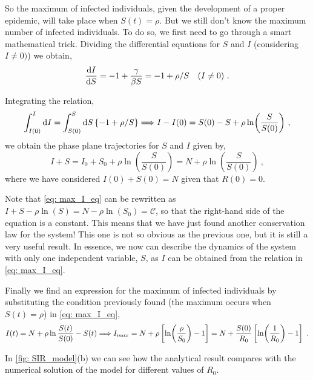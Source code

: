So the maximum of infected individuals, given the development of a proper
epidemic, will take place when $S(t)=\rho$. But we still don't know the
maximum number of infected individuals. To do so, we first need to go through
a smart mathematical trick. Dividing the differential equations for $S$ and $I$
(considering $I\neq0)$) we obtain,
\begin{equation*}
  \frac{\mathrm{d} I}{\mathrm{d} S}=-1+\frac{\gamma}{\beta S}=-1+\rho/S \quad (I\neq0) \
  .
\end{equation*}

Integrating the relation,
\begin{equation*}
  \int_{I(0)}^{I}\mathrm{d} I=\int_{S(0)}^S\mathrm{d} S \left\{-1 + \rho/S\right\} \Longrightarrow
  I-I(0)=S(0)-S+\rho\ln(\frac{S}{S(0)}) \ ,
\end{equation*}
we obtain the phase plane trajectories for $S$ and $I$ given by,
\begin{equation}\label{eq: max_I_eq}
  I+S=I_0+S_0+\rho\ln(\frac{S}{S(0)})=N+\rho\ln(\frac{S}{S(0)}) \ ,
\end{equation}
where we have considered $I(0)+S(0)=N$ given that $R(0)=0$.

Note that \cref{eq: max_I_eq} can be rewritten as
$I+S-\rho\ln(S)=N-\rho\ln(S_0)=\mathcal{C}$, so that the right-hand side of the
equation is a constant. This means that we have just found another conservation
law for the system! This one is not so obvious as the previous one, but it is
still a very useful result. In essence, we now can describe the dynamics of the
system with only one independent variable, $S$, as $I$ can be obtained from the
relation in \cref{eq: max_I_eq}.

Finally we find an expression for the maximum of infected individuals by
substituting the condition previously found (the maximum occurs when
$S(t)=\rho$)
in \cref{eq:  max_I_eq},
\begin{equation}
  I(t)=N+\rho\ln{\frac{S(t)}{S(0)}}-S(t) \Longrightarrow
  I_{max}=N+\rho\claudator{\ln(\frac{\rho}{S_0}) -
    1}=N+\frac{S(0)}{R_0}\claudator{\ln(\frac{1}{R_0}) - 1} \ .
\end{equation}

In \cref{fig: SIR_model}(b) we can see how the analytical result compares with
the numerical solution of the model for different values of $R_0$.

